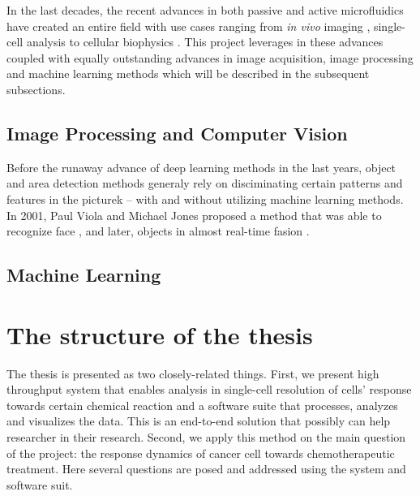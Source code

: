 \documentclass[pdftex,12pt,a4paper]{report}
\begin{document}
In the last decades, the recent advances in both passive and active microfluidics have created an entire field \cite{whitesides2006origins} with use cases ranging from \textit{in vivo} imaging \cite{chronis2007microfluidics}, single-cell analysis \cite{wheeler2003microfluidic} to cellular biophysics \cite{di2010bacterial}. This project leverages in these advances coupled with equally outstanding advances in image acquisition, image processing and machine learning methods which will be described in the subsequent subsections.

\subsection{Image Processing and Computer Vision}

\label{subsection:cv_advances}

Before the runaway advance of deep learning methods in the last years, object and area detection methods generaly rely on disciminating certain patterns and features in the picturek -- with and without utilizing machine learning methods. In 2001, Paul Viola and Michael Jones proposed a method that was able to recognize face \cite{viola2004robust}, and later, objects in almost real-time fasion \cite{viola2001rapid}. %


\subsection{Machine Learning}

\label{subsection:ml_advances}


\section{The structure of the thesis}


The thesis is presented as two closely-related things. First, we present high throughput system that enables analysis in single-cell resolution of cells' response towards certain chemical reaction and a software suite that processes, analyzes and visualizes the data. This is an end-to-end solution that possibly can help researcher in their research. Second, we apply this method on the main question of the project: the response dynamics of cancer cell towards chemotherapeutic treatment. Here several questions are posed and addressed using the system and software suit.
\end{document}
